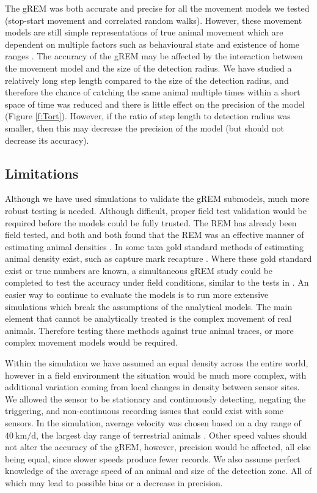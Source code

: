 \documentclass[a4paper,10pt,reqno,oneside]{amsart}
\begin{document}
The gREM was both accurate and precise for all the movement models we tested (stop-start movement and correlated random walks). However, these movement models are still simple representations of true animal movement which are dependent on multiple factors such as behavioural state and existence of home ranges \citep{smouse2010stochastic}. The accuracy of the gREM may be affected by the interaction between the movement model and the size of the detection radius. We have studied a relatively long step length compared to the size of the detection radius, and therefore the chance of catching the same animal multiple times within a short space of time was reduced and there is little effect on the precision of the model (Figure \ref{f:Tort}). However, if the ratio of step length to detection radius was smaller, then this may decrease the precision of the model (but should not decrease its accuracy). 

\subsection*{Limitations}
Although we have used simulations to validate the gREM submodels, much more robust testing is needed. Although difficult, proper field test validation would be required before the models could be fully trusted. The REM \citep{rowcliffe2008estimating} has already been field tested, and both \citet{rowcliffe2008estimating} and \citet{zero2013monitoring} both found that the REM was an effective manner of estimating animal densities \citep{rowcliffe2008estimating, zero2013monitoring}. In some taxa gold standard methods of estimating animal density exist, such as capture mark recapture \citep{sollmann2013using}. Where these gold standard exist or true numbers are known, a simultaneous gREM study could be completed to test the accuracy under field conditions, similar to the tests in \citet{rowcliffe2008estimating}. An easier way to continue to evaluate the models is to run more extensive simulations which break the assumptions of the analytical models. The main element that cannot be analytically treated is the complex movement of real animals. Therefore testing these methods against true animal traces, or more complex movement models would be required.

Within the simulation we have assumed an equal density across the entire world, however in a field environment the situation would be much more complex, with additional variation coming from local changes in density between sensor sites. We allowed the sensor to be stationary and continuously detecting, negating the triggering, and non-continuous recording issues that could exist with some sensors. In the simulation, average velocity was chosen based on a
day range of $\SI{40}{\kilo\meter \per \day}$, the largest day range of terrestrial animals \citep{carbone2005far}. Other speed values should not alter the accuracy of the gREM, however, precision would be affected, all else being equal, since slower speeds produce fewer records. We also assume perfect knowledge of the average speed of an animal and size of the detection zone. All of which may lead to possible bias or a decrease in precision. 
\end{document}
